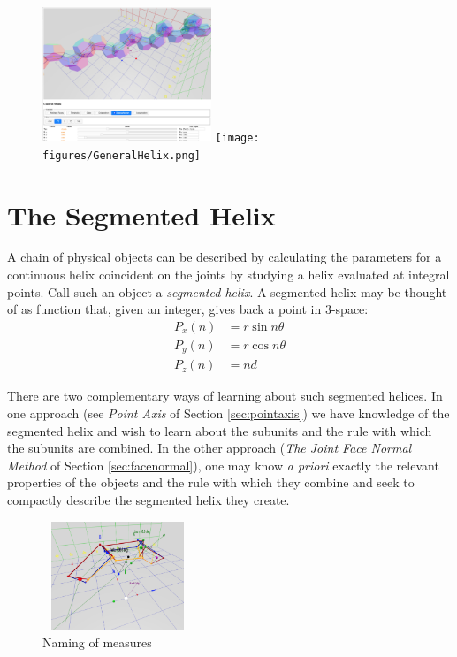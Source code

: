 \documentclass{svproc}
\begin{document}
\begin{figure}
     \centering

                {
     \includegraphics[width=0.45\textwidth]{figures/Dodecahedral.png}
       }
{\texttt{[image: figures/GeneralHelix.png]}}
  \label{fig:dodecahedron}
\end{figure}

\section{The Segmented Helix}

A chain of physical objects can be described by
calculating
the parameters for a continuous helix coincident on the joints by studying
a helix evaluated at integral points. Call such an object a {\em segmented helix}.
A segmented helix may be thought of as function that, given an integer, gives back a point in
3-space:
\begin{align}
    P_x(n) &= r \sin{n \theta}  \\
    P_y(n) &= r \cos{n \theta} \\
   P_z(n) &= n d
\end{align}

There are two complementary ways of learning about such segmented helices.
In one approach (see {\em Point Axis} of Section \ref{sec:pointaxis})
we have knowledge of the segmented helix and
wish to learn about the subunits and the rule with which the subunits are combined.
In the other approach ({\em The Joint Face Normal Method} of Section \ref{sec:facenormal}),
one may know {\it a priori} exactly the
relevant properties of the objects and the rule with which they combine
and seek to compactly describe the segmented helix they create.


\begin{figure}
     \centering
     \includegraphics[width=0.4\textwidth,height=3.25cm]{figures/ABCDFigure.png}
     \caption{Naming of measures}
  \label{fig:naming}
\end{figure}
\end{document}
